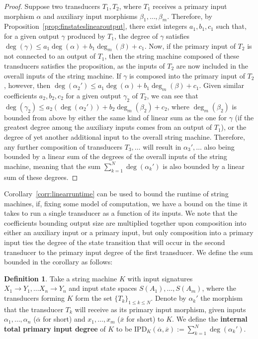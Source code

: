 \documentclass{article}
\theoremstyle{definition}
\newtheorem{definition}{Definition}[section]
\theoremstyle{remark}
\begin{document}
\begin{proof}
Suppose two transducers $T_1,T_2$, where $T_1$ receives a primary
input morphism $\alpha$ and auxiliary input morphisms
$\beta_1,\dots,\beta_m$. Therefore, by Proposition~\ref{prop:finstateslinearoutput}, there exist integers
$a_1,b_1,c_1$ such that, for a given output $\gamma$ produced by $T_1$,
the degree of $\gamma$ satisfies
$\deg(\gamma) \leq a_1\deg(\alpha)+b_1\deg_m(\beta)+c_1$.
Now, if the primary input of $T_2$ is not connected to an output of
$T_1$, then the string machine composed of these transducers satisfies
the proposition, as the inputs of $T_2$ are now included in the overall
inputs of the string machine. If $\gamma$ is composed into the primary
input of $T_2$, however, then $\deg(\alpha_2') \leq
a_1\deg(\alpha)+b_1\deg_m(\beta)+c_1$. Given similar coefficients
$a_2,b_2,c_2$ for a given output $\gamma_2$ of $T_2$, we can see that
$\deg(\gamma_2) \leq a_2(\deg(\alpha_2'))+b_2\deg_m(\beta_2)+c_2$, where
$\deg_m(\beta_2)$ is bounded from above by either the same kind of
linear sum as the one for $\gamma$ (if the greatest degree among the
auxiliary inputs comes from an output of $T_1$), or the degree of
yet another additional input to the overall string machine. Therefore,
any further composition of transducers $T_3,\dots$ will result in
$\alpha_3',\dots$ also being bounded by a linear sum of the
degrees of the overall
inputs of the string machine, meaning that the sum
$\sum_{k=1}^N \deg(\alpha_k')$ is also bounded by a linear sum of these
degrees.
\end{proof}
Corollary~\ref{corr:linearruntime} can be used to bound the runtime of
string machines, if, fixing some model of computation, we
have a bound on the time it takes to run a single transducer as
a function of its inputs. We note
that the coefficients bounding output size are multiplied together upon
composition into either an auxiliary input or a primary input, but
only composition into a primary input ties the degree
of the state transition that will occur in the
second transducer to the primary input degree of the first
transducer. We define the sum bounded in the corollary as follows:
\begin{definition}
    \label{def:totalinput} Take a string machine $K$ with input
    signatures $X_1\to Y_1, \dots X_n\to Y_n$ and input state
    spaces $S(A_1),\dots,S(A_m)$, where the transducers forming
    $K$ form the set $\{T_k\}_{1\leq k \leq N}$. Denote
    by $\alpha_k'$ the morphism that the transducer $T_k$
    will receive as its primary input morphism, given
    inputs $\alpha_1,\dots,\alpha_n$
    ($\overline{\alpha}$ for short) and $x_1,\dots,x_m$ 
    ($\overline{x}$ for short) to $K$.
    We define the
    \textbf{internal total primary input degree} of $K$ to be
    $\mathrm{IPD}_K(\overline{\alpha},\overline{x}):=\mathrm\sum_{k=1}^N \deg(\alpha_k')$. 
\end{definition}
\end{document}
